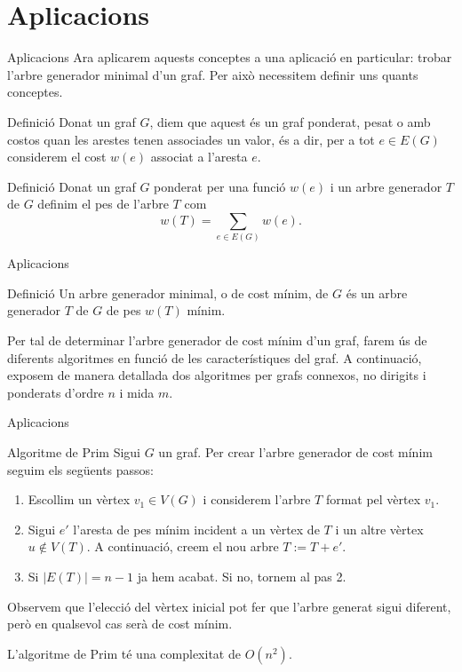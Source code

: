 \documentclass{beamer}
\begin{document}
\section{Aplicacions}
\begin{frame}{Aplicacions}
Ara aplicarem aquests conceptes a una aplicació en particular: trobar l'arbre generador minimal d'un graf. Per això necessitem definir uns quants conceptes.\pause
\begin{block}{Definició}
Donat un graf $G$, diem que aquest és un graf ponderat, pesat o amb costos quan les arestes tenen associades un valor, és a dir, per a tot $e\in E(G)$ considerem el cost $w(e)$ associat a l'aresta $e$.
\end{block}\pause
\begin{block}{Definició}
Donat un graf $G$ ponderat per una funció $w(e)$ i un arbre generador $T$ de $G$ definim el pes de l’arbre $T$ com $$w(T)=\sum_{e\in E(G)} w(e).$$
\end{block}
\end{frame}
\begin{frame}{Aplicacions}
\begin{block}{Definició}
Un arbre generador minimal, o de cost mínim, de $G$ és un arbre generador $T$ de $G$ de pes $w(T)$ mínim.
\end{block}\pause
Per tal de determinar l’arbre generador de cost mínim d’un graf, farem ús de diferents algoritmes en funció de les característiques del graf. A continuació, exposem de manera detallada dos algoritmes per grafs connexos, no dirigits i ponderats d’ordre $n$ i mida $m$.
\end{frame}
\begin{frame}{Aplicacions}
    \begin{alertblock}{Algoritme de Prim}
Sigui $G$ un graf. Per crear l'arbre generador de cost mínim seguim els següents passos:
\begin{enumerate}
    \item Escollim un vèrtex $v_1\in V(G)$ i considerem l’arbre $T$ format pel vèrtex $v_1$.\pause
    \item Sigui $e'$ l’aresta de pes mínim incident a un vèrtex de $T$ i un altre vèrtex $u\notin V(T)$. A continuació, creem el nou arbre $T:=T+e'$.\pause
    \item Si $|E(T)|=n-1$ ja hem acabat. Si no, tornem al pas 2.
\end{enumerate}\pause
\end{alertblock}
Observem que l’elecció del vèrtex inicial pot fer que l’arbre generat sigui diferent, però en qualsevol cas serà de cost mínim.\pause \par L’algoritme de Prim té una complexitat de $O(n^2)$.
\end{frame}
\end{document}
